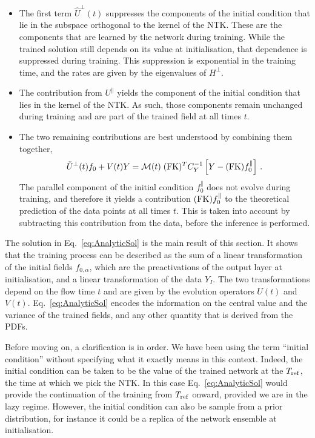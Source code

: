 \begin{itemize}
    \item The first term $\hat{U}^\perp(t)$ suppresses the components of the
    initial condition that lie in the subspace orthogonal to the kernel of the
    NTK. These are the components that are learned by the network during
    training. While the trained solution still depends on its value at
    initialisation, that dependence is suppressed during training. This
    suppression is exponential in the training time, and the rates are given by
    the eigenvalues of $H^{\perp}$.
    \item The contribution from $U^\parallel$ yields the component of the
    initial condition that lies in the kernel of the NTK. As such, those
    components remain unchanged during training and are part of the trained
    field at all times $t$. 
    \item The two remaining contributions are best understood by combining them
    together,
    \begin{align}
        \label{eq:DataCorrectedInference}
        \check{U}^{\perp}(t) f_{0} + V(t) Y 
            = \mathcal{M}(t)\; (\mathrm{FK})^T C_Y^{-1} \left[Y - (\mathrm{FK}) f_{0}^{\parallel}\right]\, .
    \end{align}
    The parallel component of the initial condition $f_{0}^{\parallel}$ does not
    evolve during training, and therefore it yields a contribution $(\mathrm{FK})
    f_{0}^{\parallel}$ to the theoretical prediction of the data points at all
    times $t$. This is taken into account by subtracting this contribution from
    the data, before the inference is performed.
\end{itemize}
The solution in Eq.~\eqref{eq:AnalyticSol} is the main result of this section.
It shows that the training process can be described as the sum of a linear
transformation of the initial fields $f_{0,\alpha}$, which are the
preactivations of the output layer at initialisation, and a linear
transformation of the data $Y_I$. The two transformations depend on the flow
time $t$ and are given by the evolution operators $U(t)$ and $V(t)$.
Eq.~\eqref{eq:AnalyticSol} encodes the information on the central value and the
variance of the trained fields, and any other quantity that is derived from the
PDFs.

Before moving on, a clarification is in order. We have been using the term
``initial condition'' without specifying what it exactly means in this context.
Indeed, the initial condition can be taken to be the value of the trained
network at the $T_{\rm ref}$, \ie the time at which we pick the NTK. In this
case Eq.~\eqref{eq:AnalyticSol} would provide the continuation of the training
from $T_{\rm ref}$ onward, provided we are in the lazy regime. However, the
initial condition can also be sample from a prior distribution, for instance it
could be a replica of the network ensemble at initialisation.

